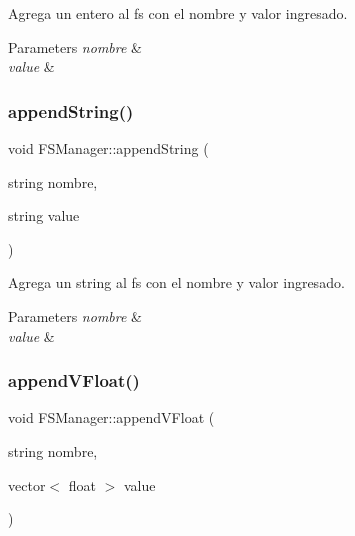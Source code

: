 Agrega un entero al fs con el nombre y valor ingresado. 


\begin{DoxyParams}{Parameters}
{\em nombre} & \\
\hline
{\em value} & \\
\hline
\end{DoxyParams}
\mbox{\label{classFSManager_a74dc93c38eb23abda9dd5651bf696c17}} 
\subsubsection{\texorpdfstring{append\+String()}{appendString()}}
{\footnotesize\ttfamily void F\+S\+Manager\+::append\+String (\begin{DoxyParamCaption}\item[{string}]{nombre,  }\item[{string}]{value }\end{DoxyParamCaption})\hspace{0.3cm}{\ttfamily [inline]}}



Agrega un string al fs con el nombre y valor ingresado. 


\begin{DoxyParams}{Parameters}
{\em nombre} & \\
\hline
{\em value} & \\
\hline
\end{DoxyParams}
\mbox{\label{classFSManager_ad6419bbb1dbc6c1059642416045dbd99}} 
\subsubsection{\texorpdfstring{append\+V\+Float()}{appendVFloat()}}
{\footnotesize\ttfamily void F\+S\+Manager\+::append\+V\+Float (\begin{DoxyParamCaption}\item[{string}]{nombre,  }\item[{vector$<$ float $>$}]{value }\end{DoxyParamCaption})\hspace{0.3cm}{\ttfamily [inline]}}



